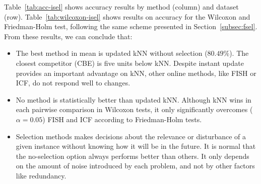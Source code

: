 \documentclass[preprint,12pt]{elsarticle}
\begin{document}
\begin{itemize}
Table~\ref{tab:acc-isel} shows accuracy results by method (column) and dataset (row). Table~\ref{tab:wilcoxon-isel} shows results on accuracy for the Wilcoxon and Friedman-Holm test, following the same scheme presented in Section~\ref{subsec:fsel}. From these results, we can conclude that: 

\begin{itemize}
	\item The best method in mean is updated kNN without selection ($80.49\%$). The closest competitor (CBE) is five units below kNN. Despite instant update provides an important advantage on kNN, other online methods, like FISH or ICF, do not respond well to changes.
	\item No method is statistically better than updated kNN. Although kNN wins in each pairwise comparison in Wilcoxon tests, it only significantly overcomes ($\alpha = 0.05$) FISH and ICF according to Friedman-Holm tests.
	\item Selection methods makes decisions about the relevance or disturbance of a given instance without knowing how it will be in the future. It is normal that the no-selection option always performs better than others. It only depends on the amount of noise introduced by each problem, and not by other factors like redundancy. %
\end{itemize}



\end{itemize}
\end{document}
